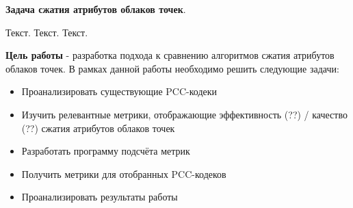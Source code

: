 \textbf{Задача сжатия атрибутов облаков точек}.

Текст. Текст. Текст.

\textbf{Цель работы} - разработка подхода к сравнению алгоритмов сжатия
атрибутов облаков точек. В рамках данной работы необходимо решить следующие
задачи:

\begin{itemize}
    \item Проанализировать существующие PCC-кодеки
    \item Изучить релевантные метрики, отображающие эффективность (??) /
    качество (??) сжатия атрибутов облаков точек
    \item Разработать программу подсчёта метрик
    \item Получить метрики для отобранных PCC-кодеков
    \item Проанализировать результаты работы
\end{itemize}


